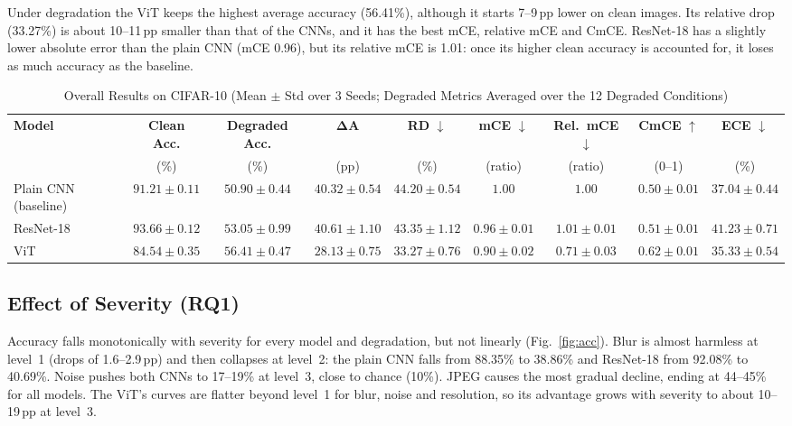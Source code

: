 \documentclass[conference]{IEEEtran}
\begin{document}
Under degradation the ViT keeps the highest average accuracy (56.41\%), although it starts 7--9\,pp lower on clean images. Its relative drop (33.27\%) is about 10--11\,pp smaller than that of the CNNs, and it has the best mCE, relative mCE and CmCE. ResNet-18 has a slightly lower absolute error than the plain CNN (mCE 0.96), but its relative mCE is 1.01: once its higher clean accuracy is accounted for, it loses as much accuracy as the baseline.

\begin{table}[!t]
\caption{Overall Results on CIFAR-10 (Mean $\pm$ Std over 3 Seeds; Degraded Metrics Averaged over the 12 Degraded Conditions)}
\label{tab:overall}
\centering
\footnotesize
\renewcommand{\arraystretch}{1.15}
\setlength{\tabcolsep}{3.6pt}
\begin{tabular}{@{}lcccccccc@{}}
\toprule
\textbf{Model} & \textbf{Clean Acc.} & \textbf{Degraded Acc.} & \textbf{$\boldsymbol{\Delta A}$} & \textbf{RD} $\downarrow$ & \textbf{mCE} $\downarrow$ & \textbf{Rel.\ mCE} $\downarrow$ & \textbf{CmCE} $\uparrow$ & \textbf{ECE} $\downarrow$ \\
 & (\%) & (\%) & (pp) & (\%) & (ratio) & (ratio) & (0--1) & (\%) \\
\midrule
Plain CNN (baseline) & $91.21 \pm 0.11$ & $50.90 \pm 0.44$ & $40.32 \pm 0.54$ & $44.20 \pm 0.54$ & $1.00$ & $1.00$ & $0.50 \pm 0.01$ & $37.04 \pm 0.44$ \\
ResNet-18 & $\mathbf{93.66 \pm 0.12}$ & $53.05 \pm 0.99$ & $40.61 \pm 1.10$ & $43.35 \pm 1.12$ & $0.96 \pm 0.01$ & $1.01 \pm 0.01$ & $0.51 \pm 0.01$ & $41.23 \pm 0.71$ \\
ViT & $84.54 \pm 0.35$ & $\mathbf{56.41 \pm 0.47}$ & $\mathbf{28.13 \pm 0.75}$ & $\mathbf{33.27 \pm 0.76}$ & $\mathbf{0.90 \pm 0.02}$ & $\mathbf{0.71 \pm 0.03}$ & $\mathbf{0.62 \pm 0.01}$ & $\mathbf{35.33 \pm 0.54}$ \\
\bottomrule
\end{tabular}
\end{table}

\subsection{Effect of Severity (RQ1)}
Accuracy falls monotonically with severity for every model and degradation, but not linearly (Fig.~\ref{fig:acc}). Blur is almost harmless at level~1 (drops of 1.6--2.9\,pp) and then collapses at level~2: the plain CNN falls from 88.35\% to 38.86\% and ResNet-18 from 92.08\% to 40.69\%. Noise pushes both CNNs to 17--19\% at level~3, close to chance (10\%). JPEG causes the most gradual decline, ending at 44--45\% for all models. The ViT's curves are flatter beyond level~1 for blur, noise and resolution, so its advantage grows with severity to about 10--19\,pp at level~3.
\end{document}
